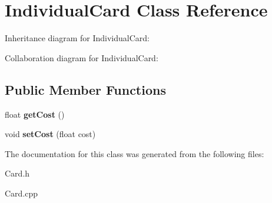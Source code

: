 \hypertarget{classIndividualCard}{}\section{Individual\+Card Class Reference}
\label{classIndividualCard}


Inheritance diagram for Individual\+Card\+:


Collaboration diagram for Individual\+Card\+:
\subsection*{Public Member Functions}
\begin{DoxyCompactItemize}
\item 
\mbox{\label{classIndividualCard_ab9e0a50ee443894395b05a130900c882}} 
float {\bfseries get\+Cost} ()
\item 
\mbox{\label{classIndividualCard_a738a123e0d070bd31ee7a849d69274e0}} 
void {\bfseries set\+Cost} (float cost)
\end{DoxyCompactItemize}


The documentation for this class was generated from the following files\+:\begin{DoxyCompactItemize}
\item 
Card.\+h\item 
Card.\+cpp\end{DoxyCompactItemize}
